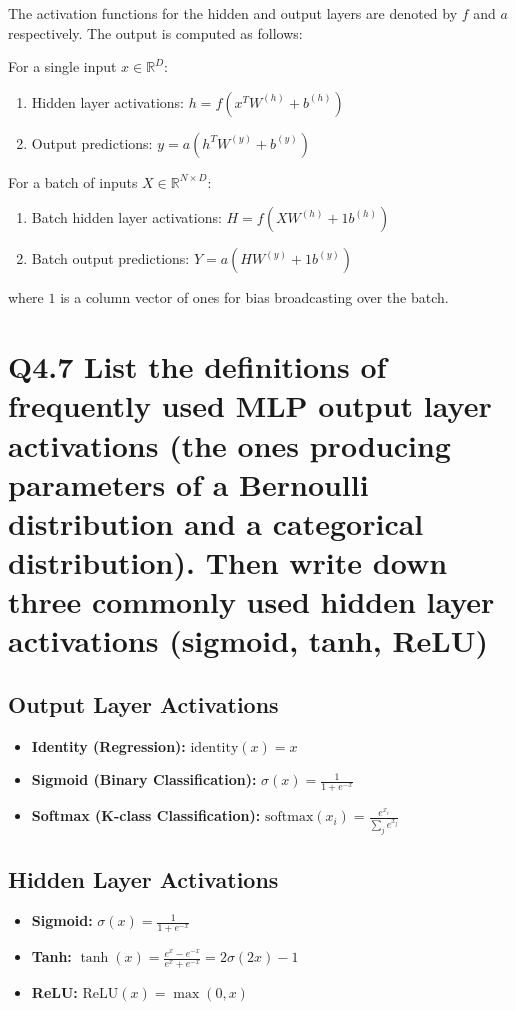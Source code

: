 \documentclass[11pt]{article}
\begin{document}
The activation functions for the hidden and output layers are denoted by \( f \) and \( a \) respectively. The output is computed as follows:

For a single input \( x \in \mathbb{R}^{D} \):
\begin{enumerate}
    \item Hidden layer activations: \( h = f(x^T W^{(h)} + b^{(h)}) \)
    \item Output predictions: \( y = a(h^T W^{(y)} + b^{(y)}) \)
\end{enumerate}

For a batch of inputs \( X \in \mathbb{R}^{N \times D} \):
\begin{enumerate}
    \item Batch hidden layer activations: \( H = f(X W^{(h)} + 1b^{(h)}) \)
    \item Batch output predictions: \( Y = a(H W^{(y)} + 1b^{(y)}) \)
\end{enumerate}
where \( 1 \) is a column vector of ones for bias broadcasting over the batch.

\section{Q4.7 List the definitions of frequently used MLP output layer activations (the ones producing parameters of a Bernoulli distribution and a categorical distribution). Then write down three commonly used hidden layer activations (sigmoid, tanh, ReLU)}

\subsection*{Output Layer Activations}
\begin{itemize}
    \item \textbf{Identity (Regression):} \( \text{identity}(x) = x \)
    \item \textbf{Sigmoid (Binary Classification):} \( \sigma(x) = \frac{1}{1 + e^{-x}} \)
    \item \textbf{Softmax (K-class Classification):} \( \text{softmax}(x_i) = \frac{e^{x_i}}{\sum_{j} e^{x_j}} \)
\end{itemize}

\subsection*{Hidden Layer Activations}
\begin{itemize}
    \item \textbf{Sigmoid:} \( \sigma(x) = \frac{1}{1 + e^{-x}} \)
    \item \textbf{Tanh:} \( \tanh(x) = \frac{e^{x} - e^{-x}}{e^{x} + e^{-x}} = 2\sigma(2x)-1\)
    \item \textbf{ReLU:} \( \text{ReLU}(x) = \max(0, x) \)
\end{itemize}
\end{document}
